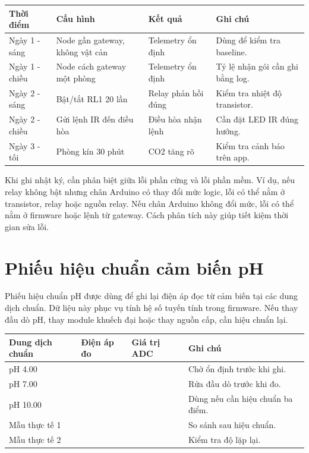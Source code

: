 \begin{longtable}{|p{2.7cm}|p{3.5cm}|p{3.2cm}|p{4.2cm}|}
\hline
\textbf{Thời điểm} & \textbf{Cấu hình} & \textbf{Kết quả} & \textbf{Ghi chú} \\
\hline
Ngày 1 - sáng & Node gần gateway, không vật cản & Telemetry ổn định & Dùng để kiểm tra baseline. \\
\hline
Ngày 1 - chiều & Node cách gateway một phòng & Telemetry ổn định & Tỷ lệ nhận gói cần ghi bằng log. \\
\hline
Ngày 2 - sáng & Bật/tắt RL1 20 lần & Relay phản hồi đúng & Kiểm tra nhiệt độ transistor. \\
\hline
Ngày 2 - chiều & Gửi lệnh IR đến điều hòa & Điều hòa nhận lệnh & Cần đặt LED IR đúng hướng. \\
\hline
Ngày 3 - tối & Phòng kín 30 phút & CO2 tăng rõ & Kiểm tra cảnh báo trên app. \\
\hline
\end{longtable}

Khi ghi nhật ký, cần phân biệt giữa lỗi phần cứng và lỗi phần mềm. Ví dụ, nếu relay không bật nhưng chân Arduino có thay đổi mức logic, lỗi có thể nằm ở transistor, relay hoặc nguồn relay. Nếu chân Arduino không đổi mức, lỗi có thể nằm ở firmware hoặc lệnh từ gateway. Cách phân tích này giúp tiết kiệm thời gian sửa lỗi.

\section{Phiếu hiệu chuẩn cảm biến pH}
Phiếu hiệu chuẩn pH được dùng để ghi lại điện áp đọc từ cảm biến tại các dung dịch chuẩn. Dữ liệu này phục vụ tính hệ số tuyến tính trong firmware. Nếu thay đầu dò pH, thay module khuếch đại hoặc thay nguồn cấp, cần hiệu chuẩn lại.

\begin{longtable}{|p{3cm}|p{3cm}|p{3cm}|p{4.2cm}|}
\hline
\textbf{Dung dịch chuẩn} & \textbf{Điện áp đo} & \textbf{Giá trị ADC} & \textbf{Ghi chú} \\
\hline
pH 4.00 &  &  & Chờ ổn định trước khi ghi. \\
\hline
pH 7.00 &  &  & Rửa đầu dò trước khi đo. \\
\hline
pH 10.00 &  &  & Dùng nếu cần hiệu chuẩn ba điểm. \\
\hline
Mẫu thực tế 1 &  &  & So sánh sau hiệu chuẩn. \\
\hline
Mẫu thực tế 2 &  &  & Kiểm tra độ lặp lại. \\
\hline
\end{longtable}

